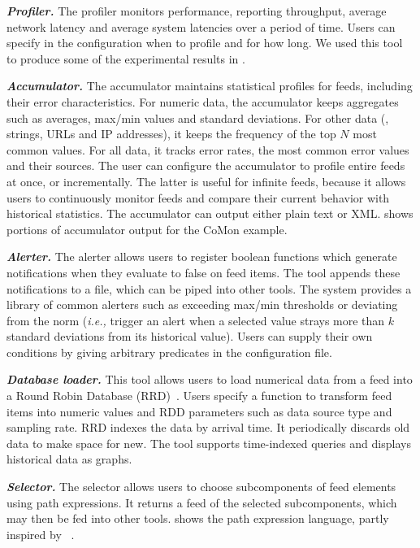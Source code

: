 \textbf{\textit{Profiler.}} The profiler monitors performance, reporting
throughput, average network latency and average system latencies
over a period of time. Users can specify in the configuration 
when to profile and for how long.  We used this tool to produce
some of the experimental results in .

\textbf{\textit{Accumulator.}} The accumulator
maintains statistical profiles for feeds, including their error characteristics. For
numeric data, the accumulator keeps aggregates such
as averages, max/min values and standard deviations. For other
data (\eg{}, strings, URLs and IP addresses), it keeps the
frequency of the top $N$ most common values. For all data, it
tracks error rates, the most common error values and their
sources.  The user can configure the accumulator to profile entire
feeds at once, or incrementally. The latter is useful for infinite
feeds, because it allows users to continuously monitor feeds
and compare their current behavior with historical statistics.  The
accumulator can output either plain text or XML. 
 shows portions of accumulator output
for the CoMon example.

\textbf{\textit{Alerter.}} The alerter allows users to register boolean 
functions which generate notifications when they evaluate to false on
feed items. The tool appends these notifications to a file, which can
be piped into other tools.  The system provides a library of 
common alerters such as exceeding max/min thresholds or deviating from the norm
({\em i.e.,} trigger an alert when a selected value strays more than $k$
standard deviations from its historical value). 
Users can supply their own conditions by giving arbitrary \ocaml{} predicates
in the configuration file.

\textbf{\textit{Database loader.}} This tool allows users to load numerical
data from a feed into a Round Robin Database
(RRD)~\cite{rrdtool}. Users specify a function to transform
feed items into numeric values and RDD parameters such as data source 
type and sampling rate. RRD indexes the data by arrival time.  It
periodically discards old data to make space for new. The tool
supports time-indexed queries and displays historical data as graphs.

\textbf{\textit{Selector.}} The selector allows users to choose
subcomponents of feed elements using path expressions. It returns a
feed of the selected subcomponents, which may then be fed into other
tools.  shows the path expression language,
partly inspired by \xpath{}~\cite{xpath}.


